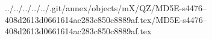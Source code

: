 ../../../../../.git/annex/objects/mX/QZ/MD5E-s4476--408d2613d0661614ac283c850c8889af.tex/MD5E-s4476--408d2613d0661614ac283c850c8889af.tex